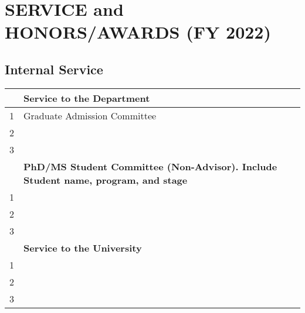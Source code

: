\documentclass[11pt]{article}
\newcommand{\fy}{2022}
\begin{document}
\newpage
\section{SERVICE and HONORS/AWARDS (FY \fy{})}

\subsection{Internal Service}

  \begin{tabular}{ll}
    \toprule
    \textbf{}& \textbf{Service to the Department}\\
      \midrule
    1& Graduate Admission Committee\\
    2& \\
    3& \\
    \toprule
    \textbf{}& \textbf{PhD/MS Student Committee (Non-Advisor). Include Student name, program, and stage}\\
      \midrule
    1& \\
    2& \\
    3& \\
    \toprule
    \textbf{}& \textbf{Service to the University}\\
      \midrule
    1& \\
    2& \\
    3& \\
    \bottomrule
  \end{tabular}


\end{document}
